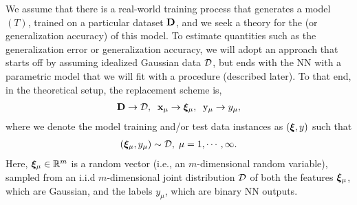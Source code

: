 We assume that there is a real-world training process that generates a \Teacher model $(T)$, trained on a particular dataset $\mathbf{D}$, and we seek a theory for the \Quality (or generalization accuracy) of this model.
 To estimate quantities such as the generalization error or generalization accuracy, we will adopt an approach that starts off by assuming idealized Gaussian data $\mathcal{D}$, 
 but ends with  the NN with a parametric model that we will fit with a \SemiEmpirical procedure (described later).
 To that end, in the theoretical setup,
the replacement scheme is,
\begin{align}
\label{eqn:model_real_world_expt}
  \mathbf{D} \rightarrow \mathcal{D},\;\;{\mathbf{x}}_{\mu} \rightarrow \boldsymbol{\xi}_{\mu},\;\;  \mathrm{y}_{\mu} \rightarrow y_{\mu}  ,
\end{align}
where we denote the model training and/or test data instances as $(\boldsymbol{\xi},y)$ 
such that
\begin{align}
    \label{eqn:xi}
  \left(\boldsymbol{\xi}_{\mu}, y_{\mu} \right) \sim \mathcal{D},\;\mu=1, \cdots, \infty  .
\end{align}
Here, $\boldsymbol{\xi}_{\mu}\in\mathbb{R}^{m}$ is a random vector (i.e., an $m$-dimensional random variable), sampled from an i.i.d $m$-dimensional joint distribution $\mathcal{D}$ of both the features $\boldsymbol{\xi}_{\mu}$, which are Gaussian, and the labels $y_{\mu}$, which are binary NN outputs.

